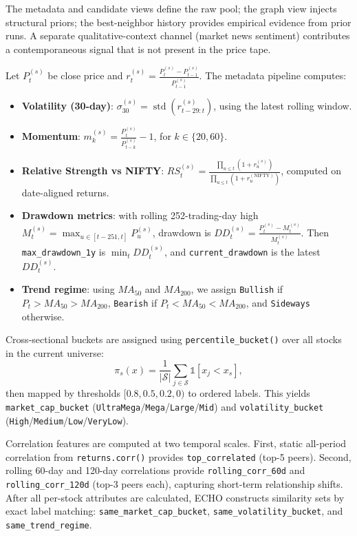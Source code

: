 \documentclass[12pt,a4paper,titlepage]{article}
\begin{document}
The metadata and candidate views define the raw pool; the graph view injects structural priors; the best-neighbor history provides empirical evidence from prior runs. A separate qualitative-context channel (market news sentiment) contributes a contemporaneous signal that is not present in the price tape.

Let \(P_t^{(s)}\) be close price and \(r_t^{(s)} = \frac{P_t^{(s)} - P_{t-1}^{(s)}}{P_{t-1}^{(s)}}\). The metadata pipeline computes:
\begin{itemize}
    \item \textbf{Volatility (30-day)}: \(\sigma_{30}^{(s)} = \operatorname{std}(r_{t-29:t}^{(s)})\), using the latest rolling window.
    \item \textbf{Momentum}: \(m_k^{(s)} = \frac{P_t^{(s)}}{P_{t-k}^{(s)}} - 1\), for \(k \in \{20, 60\}\).
    \item \textbf{Relative Strength vs NIFTY}: \(RS_t^{(s)} = \frac{\prod_{u \le t}(1 + r_u^{(s)})}{\prod_{u \le t}(1 + r_u^{(\text{NIFTY})})}\), computed on date-aligned returns.
    \item \textbf{Drawdown metrics}: with rolling 252-trading-day high \(M_t^{(s)} = \max_{u \in [t-251, t]} P_u^{(s)}\), drawdown is \(DD_t^{(s)} = \frac{P_t^{(s)} - M_t^{(s)}}{M_t^{(s)}}\). Then \texttt{max\_drawdown\_1y} is \(\min_t DD_t^{(s)}\), and \texttt{current\_drawdown} is the latest \(DD_t^{(s)}\).
    \item \textbf{Trend regime}: using \(MA_{50}\) and \(MA_{200}\), we assign \texttt{Bullish} if \(P_t > MA_{50} > MA_{200}\), \texttt{Bearish} if \(P_t < MA_{50} < MA_{200}\), and \texttt{Sideways} otherwise.
\end{itemize}

Cross-sectional buckets are assigned using \texttt{percentile\_bucket()} over all stocks in the current universe:
\[
\pi_s(x) = \frac{1}{|\mathcal{S}|}\sum_{j \in \mathcal{S}} \mathbb{1}[x_j < x_s],
\]
then mapped by thresholds \([0.8, 0.5, 0.2, 0)\) to ordered labels. This yields \texttt{market\_cap\_bucket} (\texttt{UltraMega}/\texttt{Mega}/\texttt{Large}/\texttt{Mid}) and \texttt{volatility\_bucket} (\texttt{High}/\texttt{Medium}/\texttt{Low}/\texttt{VeryLow}).

Correlation features are computed at two temporal scales. First, static all-period correlation from \texttt{returns.corr()} provides \texttt{top\_correlated} (top-5 peers). Second, rolling 60-day and 120-day correlations provide \texttt{rolling\_corr\_60d} and \texttt{rolling\_corr\_120d} (top-3 peers each), capturing short-term relationship shifts. After all per-stock attributes are calculated, ECHO constructs similarity sets by exact label matching: \texttt{same\_market\_cap\_bucket}, \texttt{same\_volatility\_bucket}, and \texttt{same\_trend\_regime}.
\end{document}
